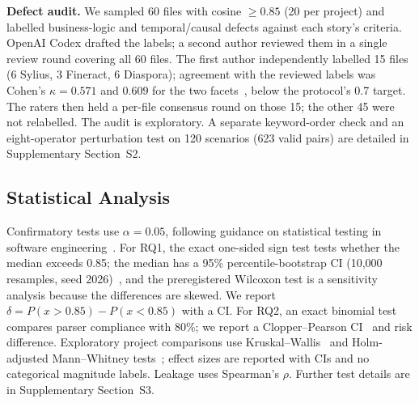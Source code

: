 \textbf{Defect audit.} We sampled 60 files with cosine $\geq0.85$ (20 per project) and labelled business-logic and temporal/causal defects against each story's criteria. OpenAI Codex drafted the labels; a second author reviewed them in a single review round covering all 60 files. The first author independently labelled 15 files (6 Sylius, 3 Fineract, 6 Diaspora); agreement with the reviewed labels was Cohen's $\kappa=0.571$ and $0.609$ for the two facets~\cite{cohen1960}, below the protocol's 0.7 target. The raters then held a per-file consensus round on those 15; the other 45 were not relabelled. The audit is exploratory. A separate keyword-order check and an eight-operator perturbation test on 120 scenarios (623 valid pairs) are detailed in Supplementary Section~S2.

\subsection{Statistical Analysis}

Confirmatory tests use $\alpha=0.05$, following guidance on statistical testing in software engineering~\cite{arcuri2011}. For RQ1, the exact one-sided sign test tests whether the median exceeds 0.85; the median has a 95\% percentile-bootstrap CI (10,000 resamples, seed 2026)~\cite{efron1993}, and the preregistered Wilcoxon test is a sensitivity analysis because the differences are skewed. We report $\delta=P(x>0.85)-P(x<0.85)$ with a CI. For RQ2, an exact binomial test~\cite{agresti2002} compares parser compliance with 80\%; we report a Clopper--Pearson CI~\cite{clopper1934} and risk difference. Exploratory project comparisons use Kruskal--Wallis~\cite{kruskal1952} and Holm-adjusted Mann--Whitney tests~\cite{holm1979}; effect sizes are reported with CIs and no categorical magnitude labels. Leakage uses Spearman's $\rho$. Further test details are in Supplementary Section~S3.
